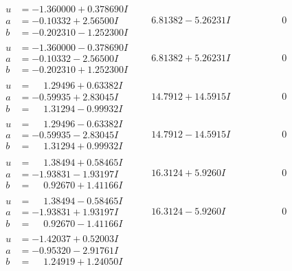 \documentclass[1p]{elsarticle_modified}
\theoremstyle{definition}
\begin{document}
$$\begin{array}{c|c|c}
 \hline 
\begin{aligned}
u &= -1.360000 + 0.378690 I \\
a &= -0.10332 + 2.56500 I \\
b &= -0.202310 - 1.252300 I\end{aligned}
 & \phantom{-}6.81382 - 5.26231 I & \phantom{-0.000000 } 0 \\ \hline\begin{aligned}
u &= -1.360000 - 0.378690 I \\
a &= -0.10332 - 2.56500 I \\
b &= -0.202310 + 1.252300 I\end{aligned}
 & \phantom{-}6.81382 + 5.26231 I & \phantom{-0.000000 } 0 \\ \hline\begin{aligned}
u &= \phantom{-}1.29496 + 0.63382 I \\
a &= -0.59935 + 2.83045 I \\
b &= \phantom{-}1.31294 - 0.99932 I\end{aligned}
 & \phantom{-}14.7912 + 14.5915 I & \phantom{-0.000000 } 0 \\ \hline\begin{aligned}
u &= \phantom{-}1.29496 - 0.63382 I \\
a &= -0.59935 - 2.83045 I \\
b &= \phantom{-}1.31294 + 0.99932 I\end{aligned}
 & \phantom{-}14.7912 - 14.5915 I & \phantom{-0.000000 } 0 \\ \hline\begin{aligned}
u &= \phantom{-}1.38494 + 0.58465 I \\
a &= -1.93831 - 1.93197 I \\
b &= \phantom{-}0.92670 + 1.41166 I\end{aligned}
 & \phantom{-}16.3124 + 5.9260 I & \phantom{-0.000000 } 0 \\ \hline\begin{aligned}
u &= \phantom{-}1.38494 - 0.58465 I \\
a &= -1.93831 + 1.93197 I \\
b &= \phantom{-}0.92670 - 1.41166 I\end{aligned}
 & \phantom{-}16.3124 - 5.9260 I & \phantom{-0.000000 } 0 \\ \hline\begin{aligned}
u &= -1.42037 + 0.52003 I \\
a &= -0.95320 - 2.91761 I \\
b &= \phantom{-}1.24919 + 1.24050 I\end{aligned}

\end{array}$$
\end{document}
